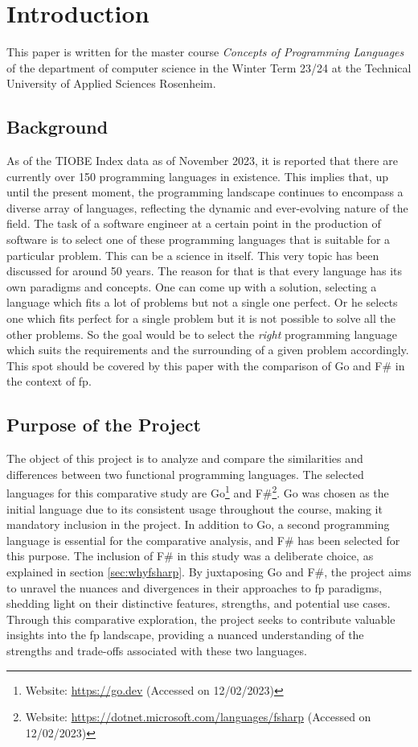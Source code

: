 \chapter{Introduction}\label{chap:introduction}
This paper is written for the master course \textit{Concepts of Programming Languages} of the department of computer science in the Winter Term 23/24 at the Technical University of Applied Sciences Rosenheim.
    \section{Background}\label{sec:background}
As of the TIOBE Index data as of November 2023, it is reported that there are currently over 150 programming languages in existence. This implies that, up until the present moment, the programming landscape continues to encompass a diverse array of languages, reflecting the dynamic and ever-evolving nature of the field.\cite{tiobeindex} The task of a software engineer at a certain point in the production of software is to select one of these programming languages that is suitable for a particular problem. This can be a science in itself. This very topic has been discussed for around 50 years.\cite{Tharp1982}
The reason for that is that every language has its own paradigms and concepts. One can come up with a solution, selecting a language which fits a lot of problems but not a single one perfect. Or he selects one which fits perfect for a single problem but it is not possible to solve all the other problems.
So the goal would be to select the \textit{right} programming language which suits the requirements and the surrounding of a given problem accordingly.
This spot should be covered by this paper with the comparison of Go and F\# in the context of \ac{fp}.

    \section{Purpose of the Project}\label{sec:purpose}
    The object of this project is to analyze and compare the similarities and differences between two functional programming languages. The selected languages for this comparative study are Go\footnote{Website: \url{https://go.dev} (Accessed on 12/02/2023)} and F\#\footnote{Website: \url{https://dotnet.microsoft.com/languages/fsharp} (Accessed on 12/02/2023)}. Go was chosen as the initial language due to its consistent usage throughout the course, making it mandatory inclusion in the project. 
    In addition to Go, a second programming language is essential for the comparative analysis, and F\# has been selected for this purpose. The inclusion of F\# in this study was a deliberate choice, as explained in section \ref{sec:whyfsharp}. By juxtaposing Go and F\#, the project aims to unravel the nuances and divergences in their approaches to \ac{fp} paradigms, shedding light on their distinctive features, strengths, and potential use cases. Through this comparative exploration, the project seeks to contribute valuable insights into the \ac{fp} landscape, providing a nuanced understanding of the strengths and trade-offs associated with these two languages.

